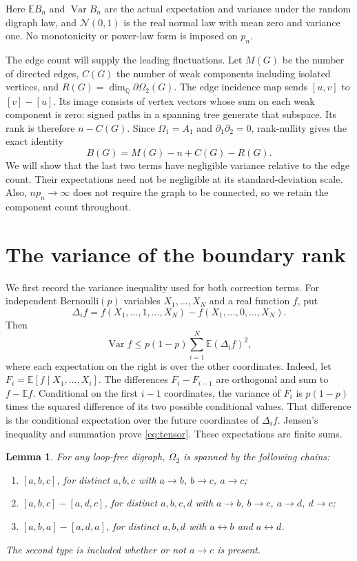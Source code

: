 \documentclass[11pt]{article}
\newtheorem{lemma}{Lemma}
\newcommand{\E}{\mathbb E}
\newcommand{\Var}{\operatorname{Var}}
\newcommand{\Q}{\mathbb Q}
\begin{document}
Here $\E B_n$ and $\Var B_n$ are the actual expectation and variance under the random digraph law, and $\mathcal N(0,1)$ is the real normal law with mean zero and variance one. No monotonicity or power-law form is imposed on $p_n$.

The edge count will supply the leading fluctuations. Let $M(G)$ be the number of directed edges, $C(G)$ the number of weak components including isolated vertices, and $R(G)=\dim_{\Q}\partial\Omega_2(G)$. The edge incidence map sends $[u,v]$ to $[v]-[u]$. Its image consists of vertex vectors whose sum on each weak component is zero: signed paths in a spanning tree generate that subspace. Its rank is therefore $n-C(G)$. Since $\Omega_1=A_1$ and $\partial_1\partial_2=0$, rank-nullity gives the exact identity
\begin{equation}\label{eq:identity}
 B(G)=M(G)-n+C(G)-R(G).
\end{equation}
We will show that the last two terms have negligible variance relative to the edge count. Their expectations need not be negligible at its standard-deviation scale. Also, $np_n\to\infty$ does not require the graph to be connected, so we retain the component count throughout.

\section{The variance of the boundary rank}

We first record the variance inequality used for both correction terms. For independent Bernoulli$(p)$ variables $X_1,\ldots,X_N$ and a real function $f$, put
\[
 \Delta_i f=f(X_1,\ldots,1,\ldots,X_N)
              -f(X_1,\ldots,0,\ldots,X_N).
\]
Then
\begin{equation}\label{eq:tensor}
 \Var f\le p(1-p)\sum_{i=1}^N\E(\Delta_i f)^2,
\end{equation}
where each expectation on the right is over the other coordinates. Indeed, let $F_i=\E[f\mid X_1,\ldots,X_i]$. The differences $F_i-F_{i-1}$ are orthogonal and sum to $f-\E f$. Conditional on the first $i-1$ coordinates, the variance of $F_i$ is $p(1-p)$ times the squared difference of its two possible conditional values. That difference is the conditional expectation over the future coordinates of $\Delta_i f$. Jensen's inequality and summation prove \eqref{eq:tensor}. These expectations are finite sums.

\begin{lemma}\label{lem:generators}
For any loop-free digraph, $\Omega_2$ is spanned by the following chains:
\begin{enumerate}
\item $[a,b,c]$, for distinct $a,b,c$ with $a\to b$, $b\to c$, $a\to c$;
\item $[a,b,c]-[a,d,c]$, for distinct $a,b,c,d$ with $a\to b$, $b\to c$, $a\to d$, $d\to c$;
\item $[a,b,a]-[a,d,a]$, for distinct $a,b,d$ with $a\leftrightarrow b$ and $a\leftrightarrow d$.
\end{enumerate}
The second type is included whether or not $a\to c$ is present.
\end{lemma}
\end{document}
